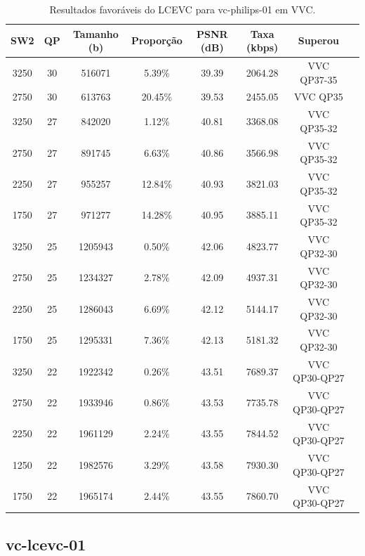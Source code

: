 \newpage
\begin{table}[h]
    \centering
    \label{tab:vc-philips-01-vvc-lcevc}
    \begin{tabular}{|c|c|c|c|c|c|c|c|}
        \hline
        \textbf{SW2} & \textbf{QP} & \textbf{Tamanho (b)} & \textbf{Proporção} & \textbf{PSNR (dB)} & \textbf{Taxa (kbps)} & \textbf{Superou} \\
        \hline
        3250 & 30 & 516071 & 5.39\% & 39.39 & 2064.28 & VVC QP37-35 \\
        2750 & 30 & 613763 & 20.45\% & 39.53 & 2455.05 & VVC QP35 \\
        3250 & 27 & 842020 & 1.12\% & 40.81 & 3368.08 & VVC QP35-32 \\
        2750 & 27 & 891745 & 6.63\% & 40.86 & 3566.98 & VVC QP35-32 \\
        2250 & 27 & 955257 & 12.84\% & 40.93 & 3821.03 & VVC QP35-32 \\
        1750 & 27 & 971277 & 14.28\% & 40.95 & 3885.11 & VVC QP35-32 \\
        3250 & 25 & 1205943 & 0.50\% & 42.06 & 4823.77 & VVC QP32-30 \\
        2750 & 25 & 1234327 & 2.78\% & 42.09 & 4937.31 & VVC QP32-30 \\
        2250 & 25 & 1286043 & 6.69\% & 42.12 & 5144.17 & VVC QP32-30 \\
        1750 & 25 & 1295331 & 7.36\% & 42.13 & 5181.32 & VVC QP32-30 \\
        3250 & 22 & 1922342 & 0.26\% & 43.51 & 7689.37 & VVC QP30-QP27 \\
        2750 & 22 & 1933946 & 0.86\% & 43.53 & 7735.78 & VVC QP30-QP27 \\
        2250 & 22 & 1961129 & 2.24\% & 43.55 & 7844.52 & VVC QP30-QP27 \\
        1250 & 22 & 1982576 & 3.29\% & 43.58 & 7930.30 & VVC QP30-QP27 \\
        1750 & 22 & 1965174 & 2.44\% & 43.55 & 7860.70 & VVC QP30-QP27 \\
        \hline
    \end{tabular}
    \caption{Resultados favoráveis do LCEVC para vc-philips-01 em VVC.}
\end{table}

\newpage
\subsection{vc-lcevc-01}


